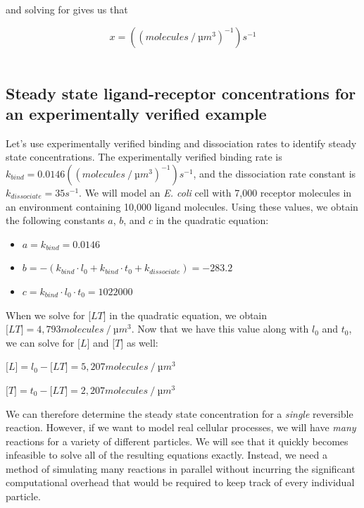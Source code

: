 and solving for  gives us that

$$x = ((molecules\mathbin{/}µm^3)^{-1})s^{-1}$$\\

\begin{qbox}\end{qbox}

\FloatBarrier
{}
\subsection{Steady state ligand-receptor concentrations for an experimentally verified example}

Let's use experimentally verified binding and dissociation rates to identify steady state concentrations. The experimentally verified binding rate is $k_{bind} = 0.0146 ((molecules\mathbin{/}µm^3)^{-1})s^{-1}$, and the dissociation rate constant is $k_{dissociate} = 35s^{-1}$.\citep{Li_2004, Spiro_1997, Stock_1991} We will model an \textit{E. coli} cell with 7,000 receptor molecules in an environment containing 10,000 ligand molecules. Using these values, we obtain the following constants $a$, $b$, and $c$ in the quadratic equation:

\begin{itemize}
 \item $a = k_{bind} = 0.0146$
 \item $b = - (k_{bind} \cdot l_0 + k_{bind} \cdot t_0 + k_{dissociate}) = -283.2$
 \item $c = k_{bind} \cdot l_0 \cdot t_0 = 1022000$
\end{itemize}

When we solve for $\text{[}LT\text{]}$ in the quadratic equation, we obtain $\text{[}LT\text{]} = 4,793 molecules\mathbin{/}µm^3$. Now that we have this value along with $l_0$ and $t_0$, we can solve for $\text{[}L\text{]}$ and $\text{[}T\text{]}$ as well:

$\text{[}L\text{]} = l_0 - \text{[}LT\text{]} = 5,207 molecules\mathbin{/}µm^3$

$\text{[}T\text{]} = t_0 - \text{[}LT\text{]} = 2,207 molecules\mathbin{/}µm^3$

We can therefore determine the steady state concentration for a \textit{single} reversible reaction. However, if we want to model real cellular processes, we will have \textit{many} reactions for a variety of different particles. We will see that it quickly becomes infeasible to solve all of the resulting equations exactly. Instead, we need a method of simulating many reactions in parallel without incurring the significant computational overhead that would be required to keep track of every individual particle.

